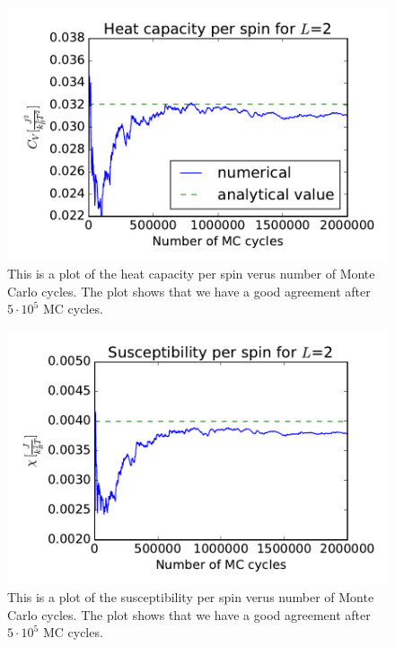 \begin{figure}[H]
\includegraphics[width=\linewidth]{../results/4b/L_2_heat_capasity}\caption{This is a plot of the heat capacity per spin verus number of Monte Carlo cycles. The plot shows that we have a good agreement after $ 5 \cdot 10^{5} $ MC cycles.}\label{fig:L_2_heat_capacity}
\end{figure}

\begin{figure}[H]
\includegraphics[width=\linewidth]{../results/4b/L_2_susceptibility}\caption{This is a plot of the susceptibility per spin verus number of Monte Carlo cycles. The plot shows that we have a good agreement after $ 5 \cdot 10^{5} $ MC cycles.}\label{fig:L_2_susceptibility}
\end{figure}

